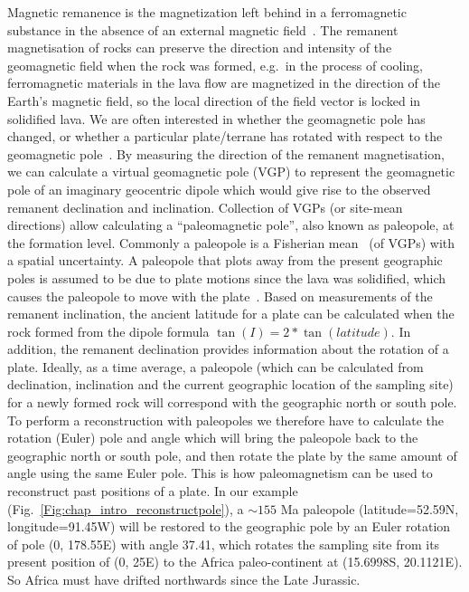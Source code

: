 Magnetic remanence is the magnetization left behind in a ferromagnetic substance
in the absence of an external magnetic field~\citep{T19}. The remanent
magnetisation of rocks can preserve the direction and intensity of the
geomagnetic field when the rock was formed, e.g.\ in the process of cooling,
ferromagnetic materials in the lava flow are magnetized in the direction of the
Earth's magnetic field, so the local direction of the field vector is locked in
solidified lava. We are often interested in whether the geomagnetic pole has
changed, or whether a particular plate/terrane has rotated with respect to the
geomagnetic pole~\citep{T19}. By measuring the direction of the remanent
magnetisation, we can calculate a virtual geomagnetic pole (VGP) to represent
the geomagnetic pole of an imaginary geocentric dipole which would give rise to
the observed remanent declination and inclination. Collection of VGPs (or
site-mean directions) allow calculating a ``paleomagnetic pole'', also known as
paleopole, at the formation level. Commonly a paleopole is a Fisherian
mean~\citep{F53} (of VGPs) with a spatial uncertainty. A paleopole that plots
away from the present geographic poles is assumed to be due to plate motions
since the lava was solidified, which causes the paleopole to move with the
plate~\citep{T08}. Based on measurements of the remanent inclination, the
ancient latitude for a plate can be calculated when the rock formed from the
dipole formula $\tan(I) = 2 *\tan(latitude)$. In addition, the remanent
declination provides information about the rotation of a plate. Ideally, as a
time average, a paleopole (which can be calculated from declination, inclination
and the current geographic location of the sampling site) for a newly formed
rock will correspond with the geographic north or south pole. To perform a
reconstruction with paleopoles we therefore have to calculate the rotation
(Euler) pole and angle which will bring the paleopole back to the geographic
north or south pole, and then rotate the plate by the same amount of angle using
the same Euler pole. This is how paleomagnetism can be used to reconstruct past
positions of a plate. In our example (Fig.~\ref{Fig:chap_intro_reconstructpole}),
a ${\sim}155$ Ma paleopole (latitude=52.59\degree{}N, longitude=91.45\degree{}W)
will be restored to the geographic pole by an Euler rotation of pole (0\degree,
178.55\degree{}E) with angle 37.41\degree, which rotates the sampling site from
its present position of (0\degree, 25\degree{}E) to the Africa paleo-continent
at (15.6998\degree{}S, 20.1121\degree{}E). So Africa must have drifted
northwards since the Late Jurassic.

